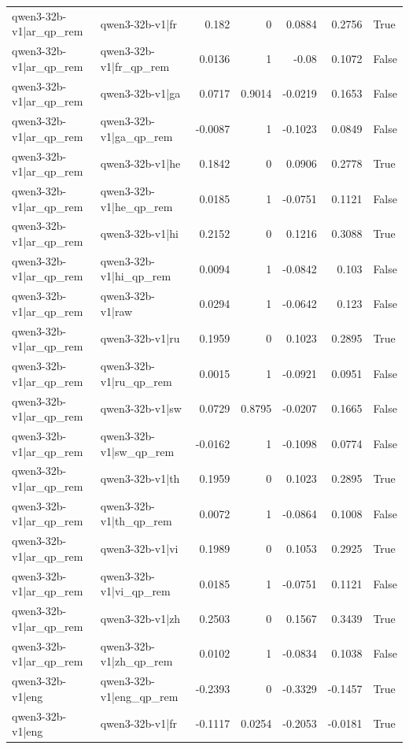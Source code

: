\begin{table}
\begin{tabular}{l l r r r r l}
qwen3-32b-v1|ar_qp_rem & qwen3-32b-v1|fr & 0.182 & 0 & 0.0884 & 0.2756 & True \\
qwen3-32b-v1|ar_qp_rem & qwen3-32b-v1|fr_qp_rem & 0.0136 & 1 & -0.08 & 0.1072 & False \\
qwen3-32b-v1|ar_qp_rem & qwen3-32b-v1|ga & 0.0717 & 0.9014 & -0.0219 & 0.1653 & False \\
qwen3-32b-v1|ar_qp_rem & qwen3-32b-v1|ga_qp_rem & -0.0087 & 1 & -0.1023 & 0.0849 & False \\
qwen3-32b-v1|ar_qp_rem & qwen3-32b-v1|he & 0.1842 & 0 & 0.0906 & 0.2778 & True \\
qwen3-32b-v1|ar_qp_rem & qwen3-32b-v1|he_qp_rem & 0.0185 & 1 & -0.0751 & 0.1121 & False \\
qwen3-32b-v1|ar_qp_rem & qwen3-32b-v1|hi & 0.2152 & 0 & 0.1216 & 0.3088 & True \\
qwen3-32b-v1|ar_qp_rem & qwen3-32b-v1|hi_qp_rem & 0.0094 & 1 & -0.0842 & 0.103 & False \\
qwen3-32b-v1|ar_qp_rem & qwen3-32b-v1|raw & 0.0294 & 1 & -0.0642 & 0.123 & False \\
qwen3-32b-v1|ar_qp_rem & qwen3-32b-v1|ru & 0.1959 & 0 & 0.1023 & 0.2895 & True \\
qwen3-32b-v1|ar_qp_rem & qwen3-32b-v1|ru_qp_rem & 0.0015 & 1 & -0.0921 & 0.0951 & False \\
qwen3-32b-v1|ar_qp_rem & qwen3-32b-v1|sw & 0.0729 & 0.8795 & -0.0207 & 0.1665 & False \\
qwen3-32b-v1|ar_qp_rem & qwen3-32b-v1|sw_qp_rem & -0.0162 & 1 & -0.1098 & 0.0774 & False \\
qwen3-32b-v1|ar_qp_rem & qwen3-32b-v1|th & 0.1959 & 0 & 0.1023 & 0.2895 & True \\
qwen3-32b-v1|ar_qp_rem & qwen3-32b-v1|th_qp_rem & 0.0072 & 1 & -0.0864 & 0.1008 & False \\
qwen3-32b-v1|ar_qp_rem & qwen3-32b-v1|vi & 0.1989 & 0 & 0.1053 & 0.2925 & True \\
qwen3-32b-v1|ar_qp_rem & qwen3-32b-v1|vi_qp_rem & 0.0185 & 1 & -0.0751 & 0.1121 & False \\
qwen3-32b-v1|ar_qp_rem & qwen3-32b-v1|zh & 0.2503 & 0 & 0.1567 & 0.3439 & True \\
qwen3-32b-v1|ar_qp_rem & qwen3-32b-v1|zh_qp_rem & 0.0102 & 1 & -0.0834 & 0.1038 & False \\
qwen3-32b-v1|eng & qwen3-32b-v1|eng_qp_rem & -0.2393 & 0 & -0.3329 & -0.1457 & True \\
qwen3-32b-v1|eng & qwen3-32b-v1|fr & -0.1117 & 0.0254 & -0.2053 & -0.0181 & True \\

\end{tabular}
\end{table}
